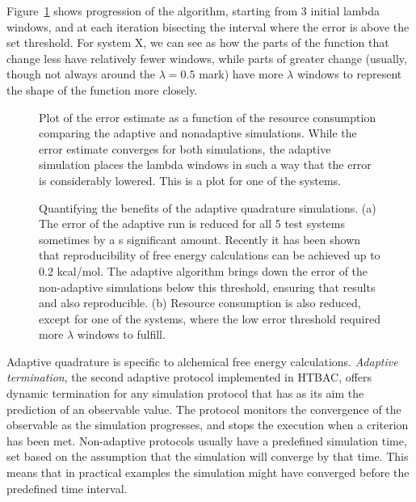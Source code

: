 Figure~\ref{fig:adapconv} shows progression of the algorithm, starting from 3
initial lambda windows, and at each iteration bisecting the interval where the
error is above the set threshold. For system X, we can see as how the parts of
the function that change less have relatively fewer windows, while parts of
greater change (usually, though not always around the $\lambda=0.5$ mark) have
more $\lambda$ windows to represent the shape of the function more closely.


\begin{figure}
  
  \caption{Plot of the error estimate as a function of the resource consumption
  comparing the adaptive and nonadaptive simulations. While the error estimate
  converges for both simulations, the adaptive simulation places the lambda
  windows in such a way that the error is considerably lowered. This is a plot
  for one of the systems.}
  \label{fig:adapconv}
\end{figure}

\begin{figure}
  
  \caption{Quantifying the benefits of the adaptive quadrature simulations. (a)
  The error of the adaptive run is reduced for all 5 test systems sometimes by a
  s significant amount. Recently \cite{} it has been shown that reproducibility
  of free energy calculations can be achieved up to 0.2 kcal/mol. The adaptive
  algorithm brings down the error of the non-adaptive simulations below this
  threshold, ensuring that results and also reproducible. (b) Resource
  consumption is also reduced, except for one of the systems, where the low
  error threshold required more $\lambda$ windows to fulfill.}
  \label{fig:savings}
\end{figure}

Adaptive quadrature is specific to alchemical free energy calculations.
\emph{Adaptive termination}, the second adaptive protocol implemented in HTBAC,
offers dynamic termination for any simulation protocol that has as its aim the
prediction of an observable value. The protocol monitors the convergence of the
observable as the simulation progresses, and stops the execution when a
criterion has been met. Non-adaptive protocols usually have a predefined
simulation time, set based on the assumption that the simulation will converge
by that time. This means that in practical examples the simulation might have
converged before the predefined time interval. 

